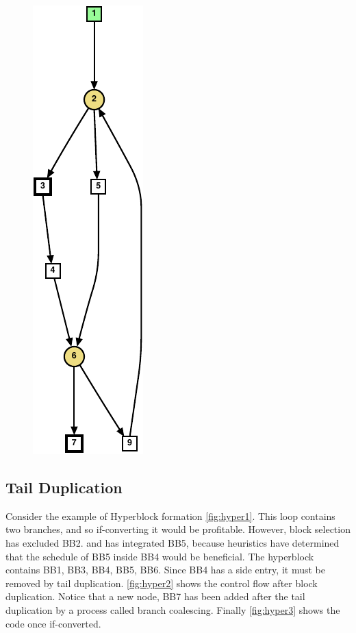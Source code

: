 \begin{figure}
{    \includegraphics[scale=0.6]{graph7}
    \label{fig:wc2}}
\label{fig:wc example}
\end{figure}

\subsection{Tail Duplication}

Consider the example of Hyperblock formation \ref{fig:hyper1}. This loop contains two branches, and so if-converting it would be profitable. However, block selection has excluded BB2. and has integrated BB5, because heuristics have determined that the schedule of BB5 inside BB4 would be beneficial. The hyperblock contains {BB1, BB3, BB4, BB5, BB6}. Since BB4 has a side entry, it must be removed by tail duplication. \ref{fig:hyper2} shows the control flow after block duplication. Notice that a new node, BB7 has been added after the tail duplication by a process called branch coalescing. Finally \ref{fig:hyper3} shows the code once if-converted.

